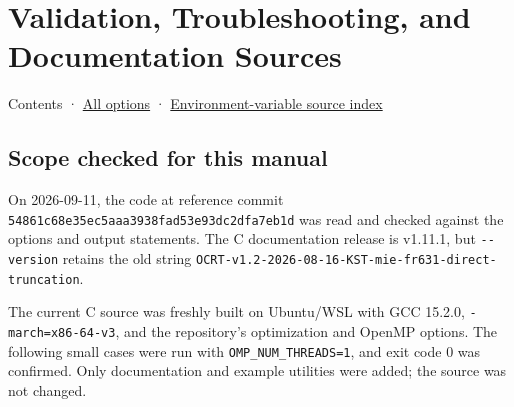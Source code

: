 \chapter{Validation, Troubleshooting, and Documentation Sources}
\label{chap:07_validation_notes}
Contents · \hyperref[chap:03_options]{All options} · \hyperref[chap:03_environment_index]{Environment-variable source index}

\section{Scope checked for this manual}
\label{sec:auto:07_validation_notes:1}
On 2026-09-11, the code at reference commit \texttt{54861c68e35ec5aa\allowbreak{}a3938fad53e93dc2\allowbreak{}dfa7eb1d} was read and checked against the options and output statements. The C documentation release is v1.11.1, but \texttt{-\allowbreak{}-\allowbreak{}version} retains the old string \texttt{OCRT-\allowbreak{}v1.\allowbreak{}2-\allowbreak{}2026-\allowbreak{}08-\allowbreak{}16-\allowbreak{}KST-\allowbreak{}mie-\allowbreak{}fr631-\allowbreak{}direct-\allowbreak{}truncation}.

The current C source was freshly built on Ubuntu/WSL with GCC 15.2.0, \texttt{-\allowbreak{}march=\allowbreak{}x86-\allowbreak{}64-\allowbreak{}v3}, and the repository's optimization and OpenMP options. The following small cases were run with \texttt{OMP\_\allowbreak{}NUM\_\allowbreak{}THREADS=\allowbreak{}1}, and exit code 0 was confirmed. Only documentation and example utilities were added; the source was not changed.


